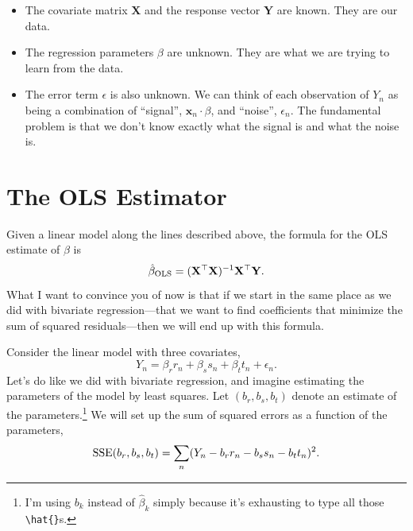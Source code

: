 \documentclass[12pt,oneside,openany]{book}
\begin{document}
\begin{itemize}
\item
  The covariate matrix \(\mathbf{X}\) and the response vector
  \(\mathbf{Y}\) are known. They are our data.
\item
  The regression parameters \(\beta\) are unknown. They are what we are
  trying to learn from the data.
\item
  The error term \(\epsilon\) is also unknown. We can think of each
  observation of \(Y_n\) as being a combination of ``signal'',
  \(\mathbf{x}_n \cdot \beta\), and ``noise'', \(\epsilon_n\). The
  fundamental problem is that we don't know exactly what the signal is
  and what the noise is.
\end{itemize}

\section{The OLS Estimator}\label{the-ols-estimator}

Given a linear model along the lines described above, the formula for
the OLS estimate of \(\beta\) is
\[\hat{\beta}_{\text{OLS}} = (\mathbf{X}^\top \mathbf{X})^{-1} \mathbf{X}^\top \mathbf{Y}.\]
What I want to convince you of now is that if we start in the same place
as we did with bivariate regression---that we want to find coefficients
that minimize the sum of squared residuals---then we will end up with
this formula.

Consider the linear model with three covariates, \[
Y_n = \beta_r r_n + \beta_s s_n + \beta_t t_n + \epsilon_n.
\] Let's do like we did with bivariate regression, and imagine
estimating the parameters of the model by least squares. Let
\((b_r, b_s, b_t)\) denote an estimate of the parameters.\footnote{I'm
  using \(b_k\) instead of \(\hat{\beta}_k\) simply because it's
  exhausting to type all those \texttt{\textbackslash{}hat\{\}}s.} We
will set up the sum of squared errors as a function of the parameters,
\[
\mathop{\rm SSE}\nolimits(b_r, b_s, b_t)
= \sum_n (Y_n - b_r r_n - b_s s_n - b_t t_n)^2.
\]
\end{document}
